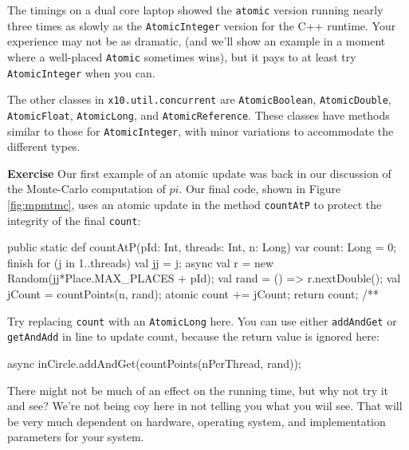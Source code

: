 The timings on a dual core laptop showed the {\tt atomic} version running nearly
three times as slowly as the {\tt AtomicInteger} version 
for the C++ runtime.  Your experience may not be as dramatic,
(and we'll show an example in a moment where a well-placed {\tt Atomic} sometimes wins),
but it pays to at least try {\tt AtomicInteger} when you can.

The other classes in {\tt x10.util.concurrent} are {\tt AtomicBoolean}, 
{\tt AtomicDouble}, {\tt AtomicFloat}, {\tt AtomicLong}, and
{\tt AtomicReference}.  These classes have methods similar to those for
{\tt AtomicInteger}, with minor variations to accommodate the different
types.

{\bf Exercise}  Our first example of an atomic update was back in
our discussion of the Monte-Carlo computation of $pi$.  Our final code,
shown in Figure \ref{fig:mpmtmc}, uses an atomic update in the
method {\tt countAtP} to protect the integrity of the final {\tt count}:
\begin{xtennum}[]
public static def countAtP(pId: Int, threads: Int, n: Long) {
    var count: Long = 0;
    finish for (j in 1..threads)  {
        val jj = j;
        async {
            val r = new Random(jj*Place.MAX_PLACES + pId);
            val rand = () => r.nextDouble();
            val jCount = countPoints(n, rand);
            atomic count += jCount;
        }
    }
    return count;
}
/**
\end{xtennum}
Try replacing {\tt count} with an {\tt AtomicLong} here.  You can use 
either {\tt addAndGet} or {\tt getAndAdd} in line 
to update count, because the return value is ignored here:

\begin{xtennum}[numbers=none]
async inCircle.addAndGet(countPoints(nPerThread, rand));
\end{xtennum}

There might not be much of an effect on the running time, but why not try it
and see?  We're not being coy here in not telling you what you wiil
see.  That will be very much dependent
on hardware, operating system, and implementation parameters for your system.

